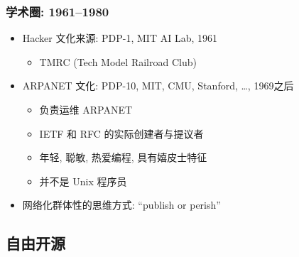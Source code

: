 \documentclass[compress]{beamer}
\begin{document}
\begin{frame}
\frametitle{学术圈: 1961--1980}
\begin{itemize}
\item Hacker 文化来源: PDP-1, MIT AI Lab, 1961
    \begin{itemize}
    \item TMRC (Tech Model Railroad Club)
    \end{itemize}
\item ARPANET 文化: PDP-10, MIT, CMU, Stanford, \ldots, 1969之后
    \begin{itemize}
    \item 负责运维 ARPANET
    \item IETF 和 RFC 的实际创建者与提议者
    \item 年轻, 聪敏, 热爱编程, 具有嬉皮士特征
    \item 并不是 Unix 程序员
    \end{itemize}
\item 网络化群体性的思维方式: ``publish or perish''
\end{itemize}
\end{frame}

\subsection{自由开源}
\end{document}
